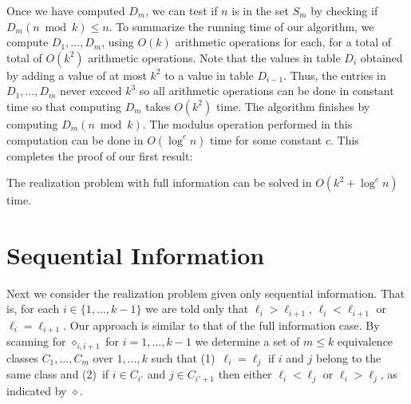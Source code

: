 \documentclass[11pt]{patmorin}
\newcommand{\op}{\diamond}
\begin{document}
Once we have computed $D_{m}$, we can test if $n$ is in the set $S_m$
by checking if $D_m(n\bmod k) \le n$.  To summarize the running time
of our algorithm, we compute $D_1,\ldots,D_m$, using $O(k)$ arithmetic
operations for each, for a total of  total of $O(k^2)$ arithmetic
operations.  Note that the values in table $D_i$ obtained by adding a
value of at most $k^2$ to a value in table $D_{i-1}$.  Thus, the
entries in $D_1,\ldots,D_m$ never exceed $k^{3}$ so all arithmetic
operations can be done in constant time so that computing $D_m$ takes
$O(k^2)$ time.  The algorithm finishes by computing $D_m(n\bmod k)$.
The modulus operation performed in this computation can be done in
$O(\log^c n)$ time for some constant $c$. This completes the proof of
our first result:

\begin{thm}
The realization problem with full information can be solved in
$O(k^2+\log^c n)$ time.
\end{thm}



\section{Sequential Information}

Next we consider the realization problem given only sequential
information.  That is, for each $i\in\{1,\ldots,k-1\}$ we are told
only that $\ell_i > \ell_{i+1}$, $\ell_i < \ell_{i+1}$ or
$\ell_i=\ell_{i+1}$.  Our approach is similar to that of the full
information case.  By scanning for $\op_{i,i+1}$ for $i=1,\ldots,k-1$
we determine a set of $m\le k$ equivalence classes $C_1,\ldots,C_m$
over $1,\ldots,k$ such that (1)~$\ell_i=\ell_j$ if $i$ and $j$ belong to the
same class and (2)~if $i\in C_{i'}$ and $j\in C_{i'+1}$ then either
$\ell_i<\ell_j$ or $\ell_i > \ell_j$, as indicated by $\op$. 
\end{document}
